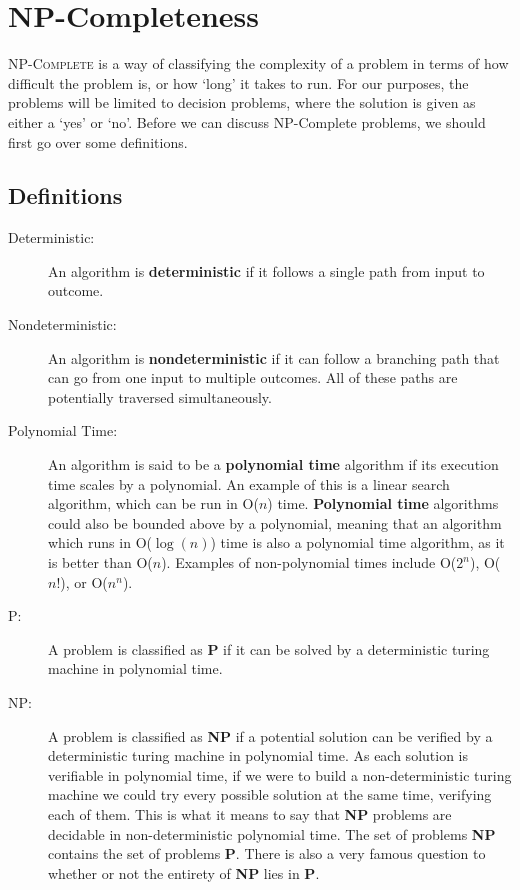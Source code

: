 \chapter{NP-Completeness}
\lettrine[lines=4]{N}{P-Complete} is a way of classifying the complexity of a problem in terms of how difficult the problem is, or how `long' it takes to run. For our purposes, the problems will be limited to decision problems, where the solution is given as either a `yes' or `no'. Before we can discuss NP-Complete problems, we should first go over some definitions.\\

\section{Definitions}
\begin{description}
    \item[Deterministic:] An algorithm is \textbf{deterministic} if it follows a single path from input to outcome.
    \item[Nondeterministic:]  An algorithm is \textbf{nondeterministic} if it can follow a branching path that can go from one input to multiple outcomes. All of these paths are potentially traversed simultaneously.
    \item[Polynomial Time:] An algorithm is said to be a \textbf{polynomial time} algorithm if its execution time scales by a polynomial. An example of this is a linear search algorithm, which can be run in O($n$) time. \textbf{Polynomial time} algorithms could also be bounded above by a polynomial, meaning that an algorithm which runs in O($\log(n)$) time is also a polynomial time algorithm, as it is better than O($n$). Examples of non-polynomial times include O($2^n$), O($n!$), or O($n^n$).
    \item[P:] A problem is classified as \textbf{P} if it can be solved by a deterministic turing machine in polynomial time.
    \item[NP:] A problem is classified as \textbf{NP} if a potential solution can be verified by a deterministic turing machine in polynomial time. As each solution is verifiable in polynomial time, if we were to build a non-deterministic turing machine we could try every possible solution at the same time, verifying each of them. This is what it means to say that \textbf{NP} problems are decidable in non-deterministic polynomial time. The set of problems \textbf{NP} contains the set of problems \textbf{P}. There is also a very famous question to whether or not the entirety of \textbf{NP} lies in \textbf{P}.

\end{description}
